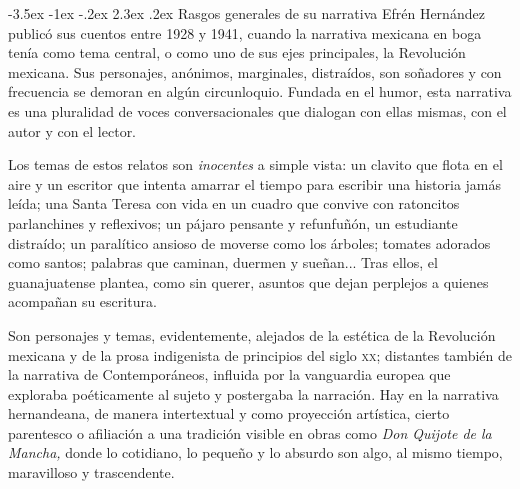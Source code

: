 \documentclass[14pt,twoside,final]{extbook} %
\makeatletter
\renewcommand\section{\@startsection {section}{1}{\z@}%
                                     {-3.5ex \@plus -1ex \@minus -.2ex}%
                                     {2.3ex \@plus .2ex}%
                                     {\normalfont\large\bfseries\sc}}
\makeatother
\begin{document}
\section{Rasgos generales de su narrativa}\label{sec:rasgos-generales-de-su-narrativa}
Efrén Hernández publicó sus cuentos entre 1928 y 1941, cuando la narrativa mexicana en boga tenía como tema central, o como uno de sus ejes principales, la Revolución mexicana. Sus personajes, anónimos, marginales, distraídos, son soñadores y con frecuencia se demoran en algún circunloquio. Fundada en el humor, esta narrativa es una pluralidad de voces conversacionales que dialogan con ellas mismas, con el autor y con el lector.

Los temas de estos relatos son \emph{inocentes} a simple vista: un clavito que flota en el aire y un escritor que intenta amarrar el tiempo para escribir una historia jamás leída; una Santa Teresa con vida en un cuadro que convive con ratoncitos parlanchines y reflexivos; un pájaro pensante y refunfuñón, un estudiante distraído; un paralítico ansioso de moverse como los árboles; tomates adorados como santos; palabras que caminan, duermen y sueñan... Tras ellos, el guanajuatense plantea, como sin querer, asuntos que dejan perplejos a quienes acompañan su escritura.

Son personajes y temas, evidentemente, alejados de la estética de la Revolución mexicana y de la prosa indigenista de principios del siglo \textsc{xx}; distantes también de la narrativa de Contemporáneos, influida por la vanguardia europea que exploraba poéticamente al sujeto y postergaba la narración. Hay en la narrativa hernandeana, de manera intertextual y como proyección artística, cierto parentesco o afiliación a una tradición visible en obras como \emph{Don Quijote de la Mancha,} donde lo cotidiano, lo pequeño y lo absurdo son algo, al mismo tiempo, maravilloso y trascendente.
\end{document}
